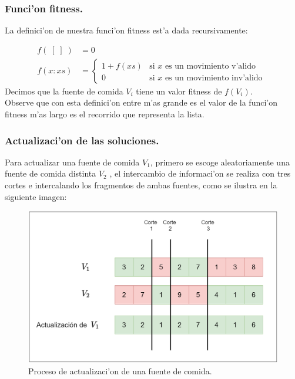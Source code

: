 \documentclass[12pt]{article}
\begin{document}
    \subsubsection{Funci'on fitness.}

    La definici'on de nuestra funci'on fitness est'a dada recursivamente:

    \begin{equation} \label{eq: fitness}
        \begin{split}
            f(\; [\;] \;) &= 0 \\
            f( x:xs ) &= \begin{cases}
                            1 + f(xs) &\text{si $x$ es un movimiento v'alido}\\
                            0 &\text{si $x$ es un movimiento inv'alido }
            \end{cases}
        \end{split}
    \end{equation}
    Decimos que la fuente de comida $V_i$ tiene un valor fitness de $f(V_i)$.\\
    Observe que con esta definici'on entre m'as grande es el valor de la funci'on fitness m'as
    largo es el recorrido que representa la lista.

    \subsubsection{Actualizaci'on de las soluciones.}\label{section: merge}

    Para actualizar una fuente de comida $V_{1}$, primero se
    escoge aleatoriamente una fuente de comida distinta $V_{2}$ , el intercambio
    de informaci'on se realiza con tres cortes e intercalando los fragmentos de ambas fuentes, como se ilustra en
    la siguiente imagen:

    \begin{figure}[H]
        \centering
        \includegraphics[scale=0.35]{merge.png}
        \caption{Proceso de actualizaci'on de una fuente de comida.}
        \label{fig:merge}
    \end{figure}
\end{document}
